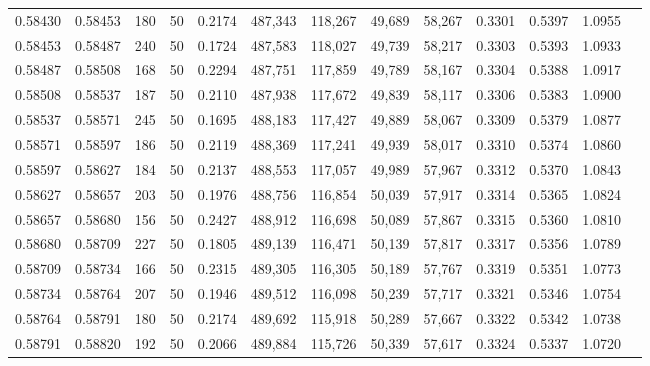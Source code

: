 \begin{tabular}{rrrrrrrrrrrrr}
0.58430 & 0.58453 &   180 &  50 &                                     0.2174 & 487,343 & 118,267 &  49,689 &  58,267 & 0.3301 & 0.5397 & 1.0955 \\
0.58453 & 0.58487 &   240 &  50 &                                     0.1724 & 487,583 & 118,027 &  49,739 &  58,217 & 0.3303 & 0.5393 & 1.0933 \\
0.58487 & 0.58508 &   168 &  50 &                                     0.2294 & 487,751 & 117,859 &  49,789 &  58,167 & 0.3304 & 0.5388 & 1.0917 \\
0.58508 & 0.58537 &   187 &  50 &                                     0.2110 & 487,938 & 117,672 &  49,839 &  58,117 & 0.3306 & 0.5383 & 1.0900 \\
0.58537 & 0.58571 &   245 &  50 &                                     0.1695 & 488,183 & 117,427 &  49,889 &  58,067 & 0.3309 & 0.5379 & 1.0877 \\
0.58571 & 0.58597 &   186 &  50 &                                     0.2119 & 488,369 & 117,241 &  49,939 &  58,017 & 0.3310 & 0.5374 & 1.0860 \\
0.58597 & 0.58627 &   184 &  50 &                                     0.2137 & 488,553 & 117,057 &  49,989 &  57,967 & 0.3312 & 0.5370 & 1.0843 \\
0.58627 & 0.58657 &   203 &  50 &                                     0.1976 & 488,756 & 116,854 &  50,039 &  57,917 & 0.3314 & 0.5365 & 1.0824 \\
0.58657 & 0.58680 &   156 &  50 &                                     0.2427 & 488,912 & 116,698 &  50,089 &  57,867 & 0.3315 & 0.5360 & 1.0810 \\
0.58680 & 0.58709 &   227 &  50 &                                     0.1805 & 489,139 & 116,471 &  50,139 &  57,817 & 0.3317 & 0.5356 & 1.0789 \\
0.58709 & 0.58734 &   166 &  50 &                                     0.2315 & 489,305 & 116,305 &  50,189 &  57,767 & 0.3319 & 0.5351 & 1.0773 \\
0.58734 & 0.58764 &   207 &  50 &                                     0.1946 & 489,512 & 116,098 &  50,239 &  57,717 & 0.3321 & 0.5346 & 1.0754 \\
0.58764 & 0.58791 &   180 &  50 &                                     0.2174 & 489,692 & 115,918 &  50,289 &  57,667 & 0.3322 & 0.5342 & 1.0738 \\
0.58791 & 0.58820 &   192 &  50 &                                     0.2066 & 489,884 & 115,726 &  50,339 &  57,617 & 0.3324 & 0.5337 & 1.0720 \\

\end{tabular}
